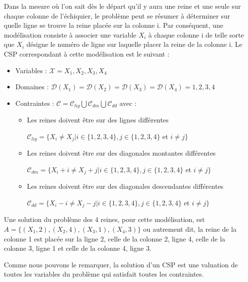 Dans la mesure où l'on sait dès le départ qu'il y aura une reine et une seule sur chaque colonne de l'échiquier, le problème peut se résumer à déterminer sur quelle ligne se trouve la reine placée sur la colonne i. Par conséquent, une modélisation consiste à associer une variable $X_i$ à chaque colonne i de telle sorte que $X_i$ désigne le numéro de ligne sur laquelle placer la reine de la colonne i. Le CSP correspondant à cette modélisation est le suivant : 
\begin{itemize}
\item Variables : $\mathcal{X} = {X_1,X_2,X_3,X_4}$

\item Domaines : $\mathcal{D}(X_1) = \mathcal{D}(X_2) = \mathcal{D}(X_3) = \mathcal{D}(X_4) = {1,2,3,4}$

\item Contraintes : $\mathcal{C} = \mathcal{C}_{lig} \bigcup \mathcal{C}_{dm} \bigcup \mathcal{C}_{dd}$ avec : 
\begin{itemize}
\item Les reines doivent être sur des lignes différentes
\begin{center}
$ \mathcal{C}_{lig} = \{X_i \neq X_j \vert i \in \{1,2,3,4\}, j \in \{1,2,3,4\} $ et $ i \neq j\} $
\end{center} 

\item Les reines doivent être sur des diagonales montantes différentes 
\begin{center}
$\mathcal{C}_{dm} = \{X_i+i \neq X_j+j | i \in \{1,2,3,4\}, j \in \{1,2,3,4\}$ et $i \neq j\}$
\end{center}

\item Les reines doivent être sur des diagonales descendantes différentes 
\begin{center}
$\mathcal{C}_{dd} = \{X_i-i \neq X_j-j | i \in \{1,2,3,4\}, j \in \{1,2,3,4\}$ et $i \neq j\}$
\end{center}
\end{itemize}
\end{itemize}

Une solution du problème des 4 reines, pour cette modélisation, est $A = \{(X_1,2), (X_2,4), (X_3,1), (X_4,3)\}$ ou autrement dit, la reine de la colonne 1 est placée sur la ligne 2, celle de la colonne 2, ligne 4, celle de la colonne 3, ligne 1 et celle de la colonne 4, ligne 3. 

Comme nous pouvons le remarquer, la solution d'un CSP est une valuation de toutes les variables du problème qui satisfait toutes les contraintes.

